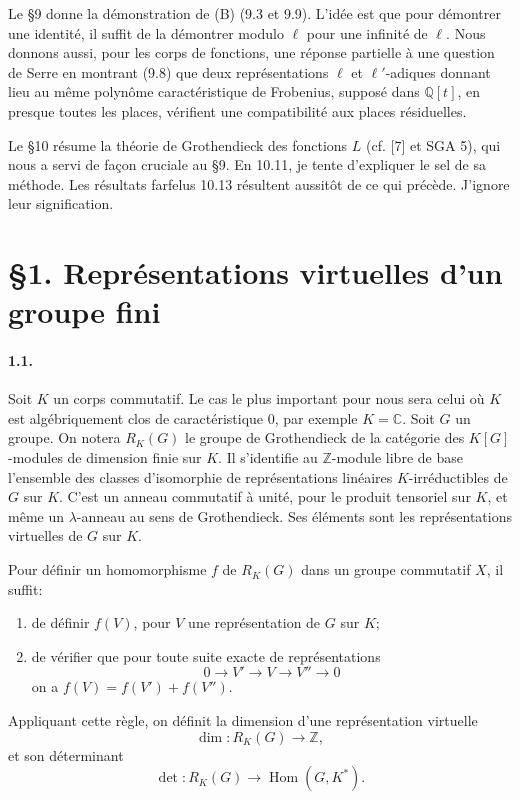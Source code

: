 \documentclass[10pt]{article}
\newcommand{\C}{\mathbb C}
\newcommand{\Q}{\mathbb Q}
\newcommand{\Z}{\mathbb Z}
\newcommand{\Hom}{\operatorname{Hom}}
\begin{document}
Le §9 donne la démonstration de (B) (9.3 et 9.9). L'idée est que pour démontrer une identité, il suffit de la démontrer modulo \(\ell\) pour une infinité de \(\ell\). Nous donnons aussi, pour les corps de fonctions, une réponse partielle à une question de Serre en montrant (9.8) que deux représentations \(\ell\) et \(\ell'\)-adiques donnant lieu au même polynôme caractéristique de Frobenius, supposé dans \(\Q[t]\), en presque toutes les places, vérifient une compatibilité aux places résiduelles.

Le §10 résume la théorie de Grothendieck des fonctions \(L\) (cf. [7] et SGA 5), qui nous a servi de façon cruciale au §9. En 10.11, je tente d'expliquer le sel de sa méthode. Les résultats farfelus 10.13 résultent aussitôt de ce qui précède. J'ignore leur signification.

\section*{\S1. Représentations virtuelles d'un groupe fini}

\paragraph{1.1.} Soit \(K\) un corps commutatif. Le cas le plus important pour nous sera celui où \(K\) est algébriquement clos de caractéristique \(0\), par exemple \(K=\C\). Soit \(G\) un groupe. On notera \(R_K(G)\) le groupe de Grothendieck de la catégorie des \(K[G]\)-modules de dimension finie sur \(K\). Il s'identifie au \(\Z\)-module libre de base l'ensemble des classes d'isomorphie de représentations linéaires \(K\)-irréductibles de \(G\) sur \(K\). C'est un anneau commutatif à unité, pour le produit tensoriel sur \(K\), et même un \(\lambda\)-anneau au sens de Grothendieck. Ses éléments sont les représentations virtuelles de \(G\) sur \(K\).

Pour définir un homomorphisme \(f\) de \(R_K(G)\) dans un groupe commutatif \(X\), il suffit:
\begin{enumerate}[label=\alph*)]
\item de définir \(f(V)\), pour \(V\) une représentation de \(G\) sur \(K\);
\item de vérifier que pour toute suite exacte de représentations
\[
0\longrightarrow V'\longrightarrow V\longrightarrow V''\longrightarrow0
\]
on a \(f(V)=f(V')+f(V'')\).
\end{enumerate}
Appliquant cette règle, on définit la dimension d'une représentation virtuelle
\[
\dim:R_K(G)\longrightarrow\Z,
\]
et son déterminant
\[
\det:R_K(G)\longrightarrow\Hom(G,K^*).
\]
\end{document}

